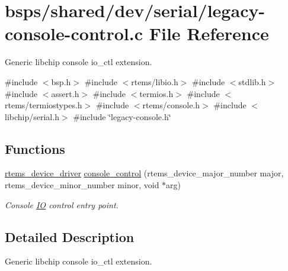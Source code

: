 \hypertarget{legacy-console-control_8c}{}\section{bsps/shared/dev/serial/legacy-\/console-\/control.c File Reference}
\label{legacy-console-control_8c}


Generic libchip console io\+\_\+ctl extension.  


{\ttfamily \#include $<$bsp.\+h$>$}\newline
{\ttfamily \#include $<$rtems/libio.\+h$>$}\newline
{\ttfamily \#include $<$stdlib.\+h$>$}\newline
{\ttfamily \#include $<$assert.\+h$>$}\newline
{\ttfamily \#include $<$termios.\+h$>$}\newline
{\ttfamily \#include $<$rtems/termiostypes.\+h$>$}\newline
{\ttfamily \#include $<$rtems/console.\+h$>$}\newline
{\ttfamily \#include $<$libchip/serial.\+h$>$}\newline
{\ttfamily \#include \char`\"{}legacy-\/console.\+h\char`\"{}}\newline
\subsection*{Functions}
\begin{DoxyCompactItemize}
\item 
\mbox{\hyperlink{group__ClassicStatus_ga545d41846817eaba6143d52ee4d9e9fe}{rtems\+\_\+device\+\_\+driver}} \mbox{\hyperlink{legacy-console-control_8c_a3ecfcbb4d683d7d77476039aba0f94db}{console\+\_\+control}} (rtems\+\_\+device\+\_\+major\+\_\+number major, rtems\+\_\+device\+\_\+minor\+\_\+number minor, void $\ast$arg)
\begin{DoxyCompactList}\small\item\em Console \mbox{\hyperlink{structIO}{IO}} control entry point. \end{DoxyCompactList}\end{DoxyCompactItemize}


\subsection{Detailed Description}
Generic libchip console io\+\_\+ctl extension. 



